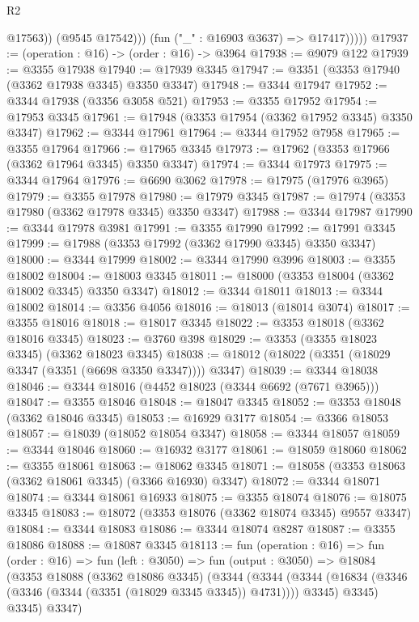 \begin{lexlean}{R2}
\begin{coremodule}
                    @17563))
                (@9545 @17542)))
            (fun ("_" : @16903 @3637) => @17417)))))
@17937 := (operation : @16) -> (order : @16) -> @3964
@17938 := @9079 @122
@17939 := @3355 @17938
@17940 := @17939 @3345
@17947 := @3351 (@3353 @17940 (@3362 @17938 @3345) @3350 @3347)
@17948 := @3344 @17947
@17952 := @3344 @17938 (@3356 @3058 @521)
@17953 := @3355 @17952
@17954 := @17953 @3345
@17961 := @17948 (@3353 @17954 (@3362 @17952 @3345) @3350 @3347)
@17962 := @3344 @17961
@17964 := @3344 @17952 @7958
@17965 := @3355 @17964
@17966 := @17965 @3345
@17973 := @17962 (@3353 @17966 (@3362 @17964 @3345) @3350 @3347)
@17974 := @3344 @17973
@17975 := @3344 @17964
@17976 := @6690 @3062
@17978 := @17975 (@17976 @3965)
@17979 := @3355 @17978
@17980 := @17979 @3345
@17987 := @17974 (@3353 @17980 (@3362 @17978 @3345) @3350 @3347)
@17988 := @3344 @17987
@17990 := @3344 @17978 @3981
@17991 := @3355 @17990
@17992 := @17991 @3345
@17999 := @17988 (@3353 @17992 (@3362 @17990 @3345) @3350 @3347)
@18000 := @3344 @17999
@18002 := @3344 @17990 @3996
@18003 := @3355 @18002
@18004 := @18003 @3345
@18011 := @18000 (@3353 @18004 (@3362 @18002 @3345) @3350 @3347)
@18012 := @3344 @18011
@18013 := @3344 @18002
@18014 := @3356 @4056
@18016 := @18013 (@18014 @3074)
@18017 := @3355 @18016
@18018 := @18017 @3345
@18022 := @3353 @18018 (@3362 @18016 @3345)
@18023 := @3760 @398
@18029 := @3353 (@3355 @18023 @3345) (@3362 @18023 @3345)
@18038 := @18012 (@18022 (@3351 (@18029 @3347 (@3351 (@6698 @3350 @3347)))) @3347)
@18039 := @3344 @18038
@18046 := @3344 @18016 (@4452 @18023 (@3344 @6692 (@7671 @3965)))
@18047 := @3355 @18046
@18048 := @18047 @3345
@18052 := @3353 @18048 (@3362 @18046 @3345)
@18053 := @16929 @3177
@18054 := @3366 @18053
@18057 := @18039 (@18052 @18054 @3347)
@18058 := @3344 @18057
@18059 := @3344 @18046
@18060 := @16932 @3177
@18061 := @18059 @18060
@18062 := @3355 @18061
@18063 := @18062 @3345
@18071 := @18058 (@3353 @18063 (@3362 @18061 @3345) (@3366 @16930) @3347)
@18072 := @3344 @18071
@18074 := @3344 @18061 @16933
@18075 := @3355 @18074
@18076 := @18075 @3345
@18083 := @18072 (@3353 @18076 (@3362 @18074 @3345) @9557 @3347)
@18084 := @3344 @18083
@18086 := @3344 @18074 @8287
@18087 := @3355 @18086
@18088 := @18087 @3345
@18113 := fun (operation : @16) =>
  fun (order : @16) =>
  fun (left : @3050) =>
  fun (output : @3050) =>
  @18084
    (@3353
      @18088
      (@3362 @18086 @3345)
      (@3344
        (@3344
          (@3344 (@16834 (@3346 (@3346 (@3344 (@3351 (@18029 @3345 @3345)) @4731)))) @3345)
          @3345)
        @3345)
      @3347)

\end{coremodule}
\end{lexlean}
